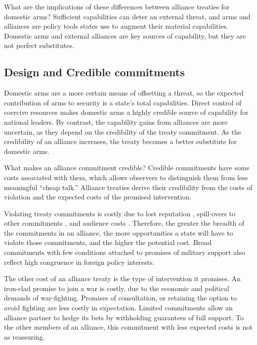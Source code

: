 \documentclass[12pt]{article}
\begin{document}
What are the implications of these differences between alliance treaties for domestic arms? Sufficient capabilities can deter an external threat, and arms and alliances are policy tools states use to augment their material capabilities. Domestic arms and external alliances are key sources of capability, but they are not perfect substitutes. 



\subsection*{Design and Credible commitments}

Domestic arms are a more certain means of offsetting a threat, so the expected contribution of arms to security is a state's total capabilities. Direct control of coercive resources makes domestic arms a highly credible source of capability for national leaders. By contrast, the capability gains from alliances are more uncertain, as they depend on the credibility of the treaty commitment. As the credibility of an alliance increases, the treaty becomes a better substitute for domestic arms. 

What makes an alliance commitment credible? Credible commitments have some costs associated with them, which allows observers to distinguish them from less meaningful ``cheap talk.'' Alliance treaties derive their credibility from the costs of violation and the expected costs of the promised intervention. 

Violating treaty commitments is costly due to lost reputation \citep{Gibler2008}, spill-overs to other commitments \citep{Crescenzi2012}, and audience costs \citep{Fearon1997, Tomz2007ar, Chibaetal2015, Levyetal2015}. Therefore, the greater the breadth of the commitments in an alliance, the more opportunities a state will have to violate those commitments, and the higher the potential cost. Broad commitments with few conditions attached to promises of military support also reflect high congruence in foreign policy interests. 

The other cost of an alliance treaty is the type of intervention it promises. An iron-clad promise to join a war is costly, due to the economic and political demands of war-fighting. Promises of consultation, or retaining the option to avoid fighting are less costly in expectation. Limited commitments allow an alliance partner to hedge its bets by withholding guarantees of full support. To the other members of an alliance, this commitment with less expected costs is not as reassuring. 
\end{document}
